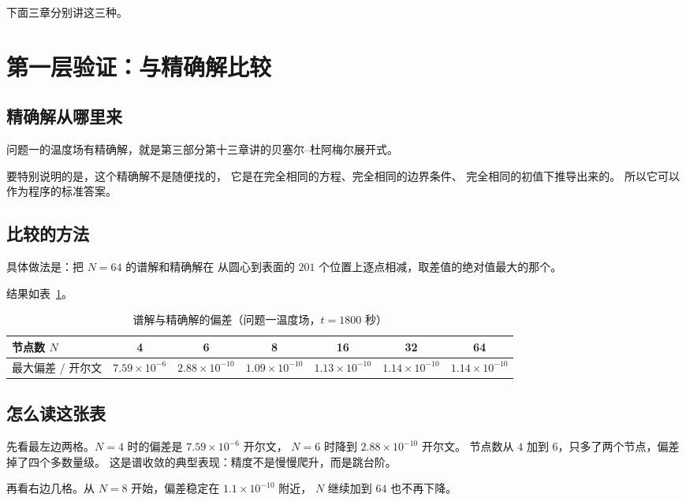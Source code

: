 下面三章分别讲这三种。

\section{第一层验证：与精确解比较}

\subsection{精确解从哪里来}

问题一的温度场有精确解，就是第三部分第十三章讲的贝塞尔--杜阿梅尔展开式。

要特别说明的是，这个精确解不是随便找的，
它是在完全相同的方程、完全相同的边界条件、
完全相同的初值下推导出来的。
所以它可以作为程序的标准答案。

\subsection{比较的方法}

具体做法是：把 $N=64$ 的谱解和精确解在
从圆心到表面的 $201$ 个位置上逐点相减，取差值的绝对值最大的那个。

结果如表~\ref{tab:verify1}。

\begin{table}[H]
\centering
\small
\caption{谱解与精确解的偏差（问题一温度场，$t=1800$ 秒）}
\label{tab:verify1}
\begin{tabular}{@{}lcccccc@{}}
\toprule
节点数 $N$ & 4 & 6 & 8 & 16 & 32 & 64 \\
\midrule
最大偏差 / 开尔文 & $7.59\times10^{-6}$ & $2.88\times10^{-10}$ & $1.09\times10^{-10}$
& $1.13\times10^{-10}$ & $1.14\times10^{-10}$ & $1.14\times10^{-10}$ \\
\bottomrule
\end{tabular}
\end{table}

\subsection{怎么读这张表}

先看最左边两格。$N=4$ 时的偏差是 $7.59\times10^{-6}$ 开尔文，
$N=6$ 时降到 $2.88\times10^{-10}$ 开尔文。
节点数从 $4$ 加到 $6$，只多了两个节点，偏差掉了四个多数量级。
这是谱收敛的典型表现：精度不是慢慢爬升，而是跳台阶。

再看右边几格。从 $N=8$ 开始，偏差稳定在 $1.1\times10^{-10}$ 附近，
$N$ 继续加到 $64$ 也不再下降。

